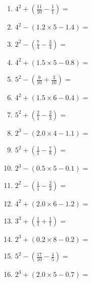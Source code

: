 \documentclass[12pt]{article}
\begin{document}
\begin{enumerate}
\item \large $ 4^{2} + (\frac{11}{10} - \frac{1}{1}) = $ \vspace{1.6cm}
\item \large $ 4^{2} - (1.2 \times 5 - 1.4) = $ \vspace{1.6cm}
\item \large $ 2^{2} - (\frac{7}{4} - \frac{3}{4}) = $ \vspace{1.6cm}
\item \large $ 4^{2} + (1.5 \times 5 - 0.8) = $ \vspace{1.6cm}
\item \large $ 5^{2} - (\frac{9}{10} + \frac{3}{10}) = $ \vspace{1.6cm}
\item \large $ 4^{2} + (1.5 \times 6 - 0.4) = $ \vspace{1.6cm}
\newpage
\item \large $ 5^{2} + (\frac{2}{1} - \frac{2}{3}) = $ \vspace{1.6cm}
\item \large $ 2^{3} - (2.0 \times 4 - 1.1) = $ \vspace{1.6cm}
\item \large $ 5^{2} + (\frac{1}{1} - \frac{7}{8}) = $ \vspace{1.6cm}
\item \large $ 2^{3} - (0.5 \times 5 - 0.1) = $ \vspace{1.6cm}
\item \large $ 2^{2} - (\frac{1}{1} - \frac{2}{3}) = $ \vspace{1.6cm}
\item \large $ 4^{2} + (2.0 \times 6 - 1.2) = $ \vspace{1.6cm}
\item \large $ 3^{3} + (\frac{1}{1} + \frac{1}{1}) = $ \vspace{1.6cm}
\item \large $ 2^{3} + (0.2 \times 8 - 0.2) = $ \vspace{1.6cm}
\item \large $ 5^{2} - (\frac{17}{10} - \frac{4}{5}) = $ \vspace{1.6cm}
\item \large $ 2^{3} + (2.0 \times 5 - 0.7) = $ \vspace{1.6cm}
\end{enumerate}\newpage
\end{document}
